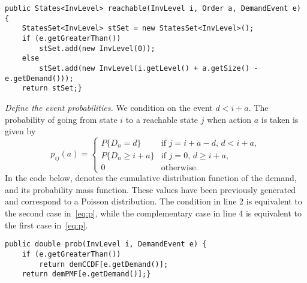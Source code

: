 \begin{lstlisting}
public States<InvLevel> reachable(InvLevel i, Order a, DemandEvent e) {
	StatesSet<InvLevel> stSet = new StatesSet<InvLevel>();
	if (e.getGreaterThan())
		stSet.add(new InvLevel(0));
	else
		stSet.add(new InvLevel(i.getLevel() + a.getSize() - e.getDemand()));
	return stSet;}
\end{lstlisting}

\emph{Define the event probabilities.} We condition on the event $d<i+a$. The
probability of going from state $i$ to a reachable state $j$ when action $a$ is
taken is given by
\begin{equation}
\label{eq:p}p_{ij}(a)=\left\{
    \begin{array}{ll}
      P\{D_n = d\} 			& \textrm{if $j= i+a-d$, $d<i+a$},\\
      P\{D_n \geq i+a\} & \textrm{if $j=0$, $d\geq i+a$},\\
      0 & \textrm{otherwise}.
    \end{array} \right.
\end{equation}
In the code below,  denotes the cumulative distribution
function of the demand, and  its probability mass function.
These values have been previously generated and correspond to a Poisson
distribution. The condition in line 2 is equivalent to the second case
in~\eqref{eq:p}, while the complementary case in line 4 is equivalent to the
first case in~\eqref{eq:p}.
\begin{lstlisting}
public double prob(InvLevel i, DemandEvent e) {
	if (e.getGreaterThan())
		return demCCDF[e.getDemand()];
	return demPMF[e.getDemand()];}
\end{lstlisting}

